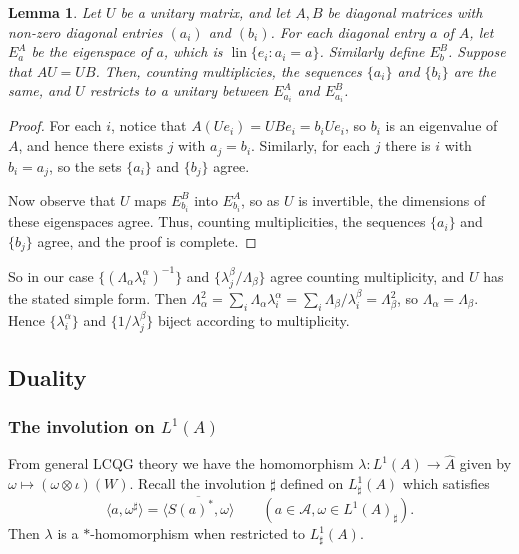 \documentclass[twoside,a4paper,12pt]{article}
\theoremstyle{plain}
\newtheorem{lemma}[proposition]{Lemma}
\theoremstyle{definition}
\newcommand{\ip}[2]{\langle #1,#2 \rangle}
\newcommand{\mc}{\mathcal}
\newcommand{\lin}{\operatorname{lin}}
\begin{document}
\begin{lemma}
Let $U$ be a unitary matrix, and let $A,B$ be diagonal matrices with
non-zero diagonal entries $(a_i)$ and $(b_i)$.
For each diagonal entry $a$ of $A$,
let $E^A_a$ be the eigenspace of $a$, which is $\lin\{ e_i : a_i=a \}$.
Similarly define $E^B_b$.  Suppose that $AU=UB$.
Then, counting multiplicies, the sequences $\{ a_i \}$ and $\{ b_i\}$ are the
same, and $U$ restricts to a unitary between $E^A_{a_i}$ and $E^B_{a_i}$.
\end{lemma}
\begin{proof}
For each $i$, notice that $A(Ue_i) = UBe_i = b_i Ue_i$, so $b_i$ is an
eigenvalue of $A$, and hence there exists $j$ with $a_j=b_i$.  Similarly,
for each $j$ there is $i$ with $b_i=a_j$, so the sets $\{a_i\}$ and
$\{b_j\}$ agree.

Now observe that $U$ maps $E^B_{b_i}$ into $E^A_{b_i}$, so as $U$ is
invertible, the dimensions of these eigenspaces agree.  Thus, counting
multiplicities, the sequences $\{ a_i\}$ and $\{b_j\}$ agree, and the proof
is complete.
\end{proof}

So in our case $\{ (\Lambda_\alpha \lambda^\alpha_i)^{-1} \}$ and 
$\{ \lambda^\beta_j / \Lambda_\beta \}$ agree counting multiplicity, and
$U$ has the stated simple form.  Then $\Lambda_\alpha^2 = \sum_i \Lambda_\alpha
\lambda^\alpha_i = \sum_i \Lambda_\beta / \lambda^\beta_i = \Lambda_\beta^2$,
so $\Lambda_\alpha=\Lambda_\beta$.  Hence $\{ \lambda^\alpha_i \}$ and
$\{ 1/\lambda^\beta_j \}$ biject according to multiplicity.





\subsection{Duality}

\subsubsection{The involution on $L^1(A)$}

From general LCQG theory we have the homomorphism $\lambda:L^1(A) \rightarrow
\hat A$ given by $\omega\mapsto (\omega\otimes\iota)(W)$.  Recall the
involution $\sharp$ defined on $L^1_\sharp(A)$ which satisfies
\[ \ip{a}{\omega^\sharp} = \overline{ \ip{S(a)^*}{\omega} }
\qquad (a\in\mc A, \omega\in L^1(A)_\sharp). \]
Then $\lambda$ is a $*$-homomorphism when restricted to $L^1_\sharp(A)$.
\end{document}
